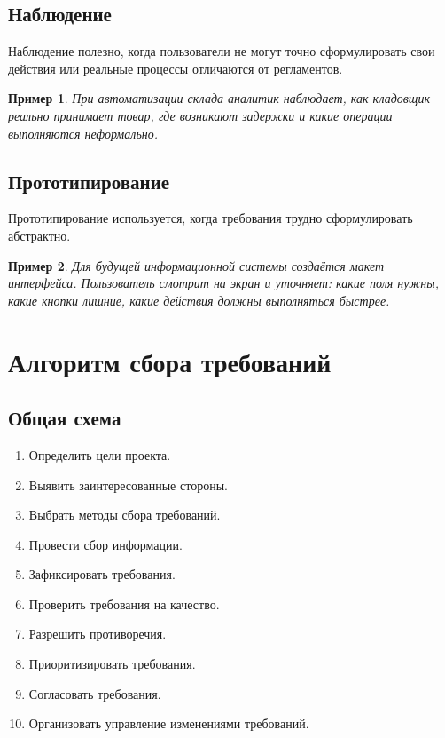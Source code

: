 \documentclass[12pt,a4paper]{article}
\newtheorem{example}{Пример}
\begin{document}
\subsection{Наблюдение}

Наблюдение полезно, когда пользователи не могут точно сформулировать свои действия или реальные процессы отличаются от регламентов.

\begin{example}
При автоматизации склада аналитик наблюдает, как кладовщик реально принимает товар, где возникают задержки и какие операции выполняются неформально.
\end{example}

\subsection{Прототипирование}

Прототипирование используется, когда требования трудно сформулировать абстрактно.

\begin{example}
Для будущей информационной системы создаётся макет интерфейса. Пользователь смотрит на экран и уточняет: какие поля нужны, какие кнопки лишние, какие действия должны выполняться быстрее.
\end{example}

\section{Алгоритм сбора требований}

\subsection{Общая схема}

\begin{enumerate}
    \item Определить цели проекта.
    \item Выявить заинтересованные стороны.
    \item Выбрать методы сбора требований.
    \item Провести сбор информации.
    \item Зафиксировать требования.
    \item Проверить требования на качество.
    \item Разрешить противоречия.
    \item Приоритизировать требования.
    \item Согласовать требования.
    \item Организовать управление изменениями требований.
\end{enumerate}
\end{document}
